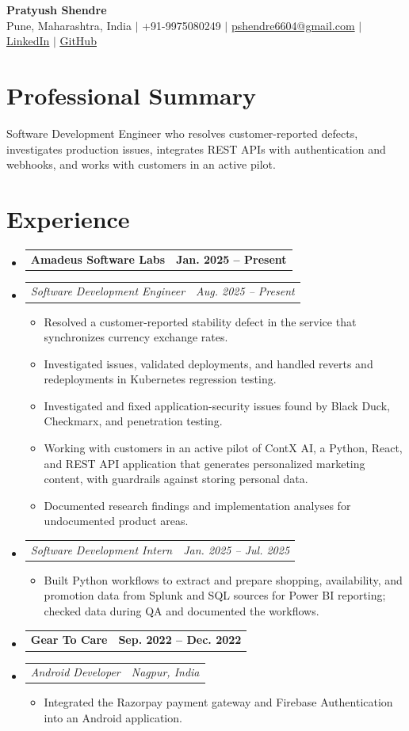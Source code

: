 \documentclass[a4paper,11pt]{article}
\makeatletter
\newcommand{\bulletpoint}[1]{\item\small{#1}}
\newcommand{\company}[2]{\item\begin{tabularx}{\textwidth}{@{}Xr@{}}\textbf{#1}& \textbf{#2}\end{tabularx}\vspace{-4pt}}
\newcommand{\role}[2]{\item\begin{tabularx}{\textwidth}{@{}Xr@{}}\textit{\small #1}&\textit{\small #2}\end{tabularx}\vspace{-5pt}}
\makeatother
\begin{document}
\begin{center}
  {\Large\bfseries Pratyush Shendre}\\[2pt]
  \small Pune, Maharashtra, India $|$ +91-9975080249 $|$
  \href{mailto:pshendre6604@gmail.com}{pshendre6604@gmail.com} $|$
  \href{https://www.linkedin.com/in/pratyush-shendre-2256a7223/}{\underline{LinkedIn}} $|$
  \href{https://github.com/PratyushS04}{\underline{GitHub}}
\end{center}

\section{Professional Summary}
\small Software Development Engineer who resolves customer-reported defects, investigates production issues, integrates REST APIs with authentication and webhooks, and works with customers in an active pilot.

\section{Experience}
\begin{itemize}[leftmargin=0in,label={}]
  \company{Amadeus Software Labs}{Jan. 2025 -- Present}
  \role{Software Development Engineer}{Aug. 2025 -- Present}
  \begin{itemize}
    \bulletpoint{Resolved a customer-reported stability defect in the service that synchronizes currency exchange rates.}
    \bulletpoint{Investigated issues, validated deployments, and handled reverts and redeployments in Kubernetes regression testing.}
    \bulletpoint{Investigated and f{}ixed application-security issues found by Black Duck, Checkmarx, and penetration testing.}
    \bulletpoint{Working with customers in an active pilot of ContX AI, a Python, React, and REST API application that generates personalized marketing content, with guardrails against storing personal data.}
    \bulletpoint{Documented research f{}indings and implementation analyses for undocumented product areas.}
  \end{itemize}
  \role{Software Development Intern}{Jan. 2025 -- Jul. 2025}
  \begin{itemize}
    \bulletpoint{Built Python workf{}lows to extract and prepare shopping, availability, and promotion data from Splunk and SQL sources for Power BI reporting; checked data during QA and documented the workf{}lows.}
  \end{itemize}
  \company{Gear To Care}{Sep. 2022 -- Dec. 2022}
  \role{Android Developer}{Nagpur, India}
  \begin{itemize}
    \bulletpoint{Integrated the Razorpay payment gateway and Firebase Authentication into an Android application.}
  \end{itemize}
\end{itemize}
\end{document}
